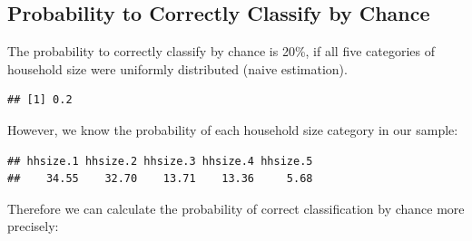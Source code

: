 \documentclass[]{article}
\newenvironment{Shaded}{\begin{snugshade}}{\end{snugshade}}
\newcommand{\ControlFlowTok}[1]{\textcolor[rgb]{0.13,0.29,0.53}{\textbf{#1}}}
\newcommand{\DataTypeTok}[1]{\textcolor[rgb]{0.13,0.29,0.53}{#1}}
\newcommand{\DecValTok}[1]{\textcolor[rgb]{0.00,0.00,0.81}{#1}}
\newcommand{\KeywordTok}[1]{\textcolor[rgb]{0.13,0.29,0.53}{\textbf{#1}}}
\newcommand{\NormalTok}[1]{#1}
\newcommand{\OperatorTok}[1]{\textcolor[rgb]{0.81,0.36,0.00}{\textbf{#1}}}
\newcommand{\OtherTok}[1]{\textcolor[rgb]{0.56,0.35,0.01}{#1}}
\newcommand{\StringTok}[1]{\textcolor[rgb]{0.31,0.60,0.02}{#1}}
\begin{document}
\hypertarget{probability-to-correctly-classify-by-chance}{%
\subsection{Probability to Correctly Classify by
Chance}\label{probability-to-correctly-classify-by-chance}}

The probability to correctly classify by chance is 20\%, if all five
categories of household size were uniformly distributed (naive
estimation).

\begin{Shaded}
\end{Shaded}

\begin{verbatim}
## [1] 0.2
\end{verbatim}

However, we know the probability of each household size category in our
sample:

\begin{Shaded}
\end{Shaded}

\begin{verbatim}
## hhsize.1 hhsize.2 hhsize.3 hhsize.4 hhsize.5 
##    34.55    32.70    13.71    13.36     5.68
\end{verbatim}

Therefore we can calculate the probability of correct classification by
chance more precisely:
\end{document}
